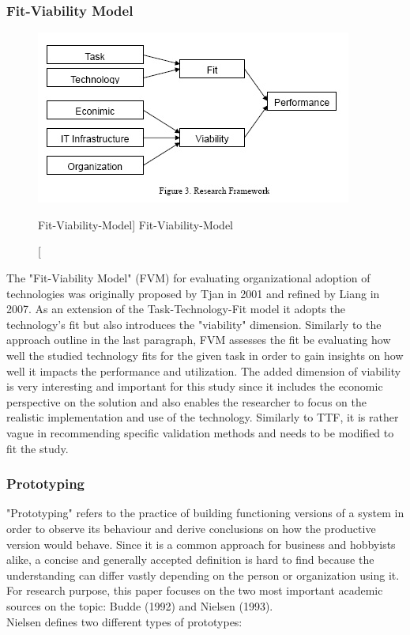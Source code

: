     \subsubsection{Fit-Viability Model}
    \begin{figure}[ht]
        \includegraphics[width=0.7\linewidth]{images/methodology/fvm.jpg}\centering
        \caption
        [Fit-Viability-Model]
        {Fit-Viability-Model \cite{Liang2007AdoptionModel}}
    \end{figure}
    The "Fit-Viability Model" (FVM) for evaluating organizational adoption of technologies was originally proposed by Tjan in 2001 and refined by Liang in 2007. As an extension of the Task-Technology-Fit model it adopts the technology's fit but also introduces the "viability" dimension. Similarly to the approach outline in the last paragraph, FVM assesses the fit be evaluating how well the studied technology fits for the given task in order to gain insights on how well it impacts the performance and utilization. The added dimension of viability is very interesting and important for this study since it includes the economic perspective on the solution and also enables the researcher to focus on the realistic implementation and use of the technology. Similarly to TTF, it is rather vague in recommending specific validation methods and needs to be modified to fit the study. 
    
    \subsubsection{Prototyping}
    "Prototyping" refers to the practice of building functioning versions of a system in order to observe its behaviour and derive conclusions on how the productive version would behave.\autocite{Budde1992Prototyping} Since it is a common approach for business and hobbyists alike, a concise and generally accepted definition is hard to find because the understanding can differ vastly depending on the person or organization using it. For research purpose, this paper focuses on the two most important academic sources on the topic: Budde (1992) and Nielsen (1993).\\
    Nielsen defines two different types of prototypes:
    
